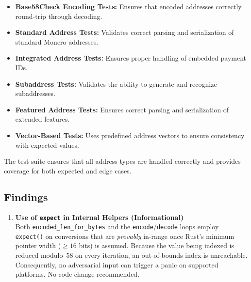 \documentclass[12pt,a4paper]{article}
\begin{document}
\begin{itemize}
    \item \textbf{Base58Check Encoding Tests:} Ensures that encoded addresses correctly round-trip through decoding.
    \item \textbf{Standard Address Tests:} Validates correct parsing and serialization of standard Monero addresses.
    \item \textbf{Integrated Address Tests:} Ensures proper handling of embedded payment IDs.
    \item \textbf{Subaddress Tests:} Validates the ability to generate and recognize subaddresses.
    \item \textbf{Featured Address Tests:} Ensures correct parsing and serialization of extended features.
    \item \textbf{Vector-Based Tests:} Uses predefined address vectors to ensure consistency with expected values.
\end{itemize}

The test suite ensures that all address types are handled correctly and provides coverage for both expected and edge cases.

\subsection{Findings}
\begin{enumerate}
    \item \textbf{Use of \texttt{expect} in Internal Helpers (Informational)}\\
    Both \texttt{encoded\_len\_for\_bytes} and the
    \texttt{encode}/\texttt{decode} loops employ
    \texttt{expect()} on conversions that are \emph{provably} in-range once
    Rust’s minimum pointer width (\(\ge 16\) bits) is assumed.  Because the
    value being indexed is reduced modulo~58 on every iteration, an
    out-of-bounds index is unreachable.  Consequently, no adversarial input can
    trigger a panic on supported platforms.  No code change recommended.


\end{enumerate}
\end{document}
